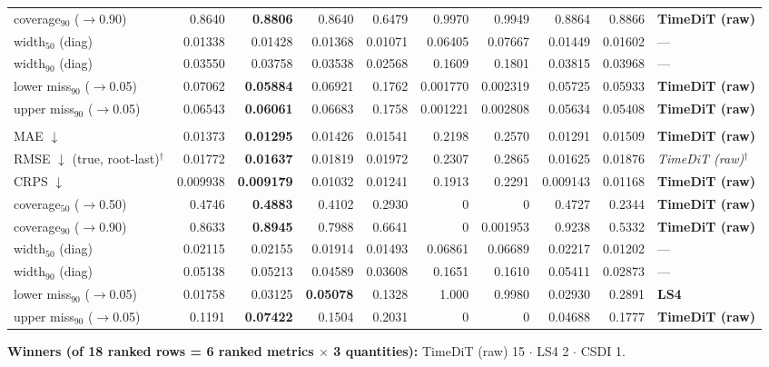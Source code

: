 \documentclass[11pt,a4paper]{article}
\begin{document}
\begin{landscape}
\begin{center}
\begin{tabular}{lrrrrrrrrl}
coverage$_{90}$ ($\to$0.90) & 0.8640 & \textbf{0.8806} & 0.8640 & 0.6479 & 0.9970 & 0.9949 & 0.8864 & 0.8866 & \textbf{TimeDiT (raw)} \\
width$_{50}$ (diag) & 0.01338 & 0.01428 & 0.01368 & 0.01071 & 0.06405 & 0.07667 & 0.01449 & 0.01602 & --- \\
width$_{90}$ (diag) & 0.03550 & 0.03758 & 0.03538 & 0.02568 & 0.1609 & 0.1801 & 0.03815 & 0.03968 & --- \\
lower miss$_{90}$ ($\to$0.05) & 0.07062 & \textbf{0.05884} & 0.06921 & 0.1762 & 0.001770 & 0.002319 & 0.05725 & 0.05933 & \textbf{TimeDiT (raw)} \\
upper miss$_{90}$ ($\to$0.05) & 0.06543 & \textbf{0.06061} & 0.06683 & 0.1758 & 0.001221 & 0.002808 & 0.05634 & 0.05408 & \textbf{TimeDiT (raw)} \\
\addlinespace
\multicolumn{10}{l}{\textbf{rv ($M$ scalar)}} \\
MAE $\downarrow$ & 0.01373 & \textbf{0.01295} & 0.01426 & 0.01541 & 0.2198 & 0.2570 & 0.01291 & 0.01509 & \textbf{TimeDiT (raw)} \\
RMSE $\downarrow$ (true, root-last)$^{\dagger}$ & 0.01772 & \textbf{0.01637} & 0.01819 & 0.01972 & 0.2307 & 0.2865 & 0.01625 & 0.01876 & \textit{TimeDiT (raw)}$^{\dagger}$ \\
CRPS $\downarrow$ & 0.009938 & \textbf{0.009179} & 0.01032 & 0.01241 & 0.1913 & 0.2291 & 0.009143 & 0.01168 & \textbf{TimeDiT (raw)} \\
coverage$_{50}$ ($\to$0.50) & 0.4746 & \textbf{0.4883} & 0.4102 & 0.2930 & 0 & 0 & 0.4727 & 0.2344 & \textbf{TimeDiT (raw)} \\
coverage$_{90}$ ($\to$0.90) & 0.8633 & \textbf{0.8945} & 0.7988 & 0.6641 & 0 & 0.001953 & 0.9238 & 0.5332 & \textbf{TimeDiT (raw)} \\
width$_{50}$ (diag) & 0.02115 & 0.02155 & 0.01914 & 0.01493 & 0.06861 & 0.06689 & 0.02217 & 0.01202 & --- \\
width$_{90}$ (diag) & 0.05138 & 0.05213 & 0.04589 & 0.03608 & 0.1651 & 0.1610 & 0.05411 & 0.02873 & --- \\
lower miss$_{90}$ ($\to$0.05) & 0.01758 & 0.03125 & \textbf{0.05078} & 0.1328 & 1.000 & 0.9980 & 0.02930 & 0.2891 & \textbf{LS4} \\
upper miss$_{90}$ ($\to$0.05) & 0.1191 & \textbf{0.07422} & 0.1504 & 0.2031 & 0 & 0 & 0.04688 & 0.1777 & \textbf{TimeDiT (raw)} \\
\bottomrule
\end{tabular}
\end{center}
\noindent\textbf{Winners (of 18 ranked rows = 6 ranked metrics $\times$ 3 quantities):} TimeDiT (raw) 15 $\cdot$ LS4 2 $\cdot$ CSDI 1.
\end{landscape}
\clearpage
\end{document}
